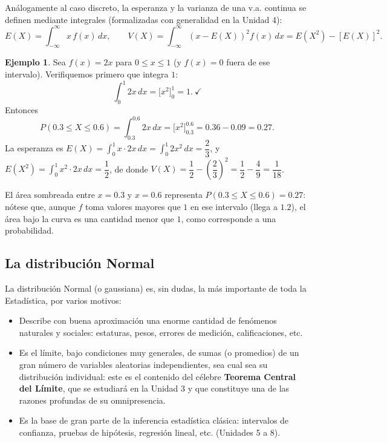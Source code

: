 \documentclass[11pt,a4paper]{article}
\theoremstyle{plain}
\theoremstyle{definition}
\newtheorem{ejemplo}[teorema]{Ejemplo}
\theoremstyle{remark}
\begin{document}
Análogamente al caso discreto, la esperanza y la varianza de una v.a. continua se definen mediante integrales (formalizadas con generalidad en la Unidad 4):
$$E(X)=\int_{-\infty}^{\infty}x\,f(x)\,dx,\qquad V(X)=\int_{-\infty}^{\infty}(x-E(X))^2f(x)\,dx=E(X^2)-[E(X)]^2.$$

\begin{ejemplo}
Sea $f(x)=2x$ para $0\le x\le1$ (y $f(x)=0$ fuera de ese intervalo). Verifiquemos primero que integra $1$:
$$\int_0^1 2x\,dx=\big[x^2\big]_0^1=1.\ \checkmark$$
Entonces
$$P(0.3\le X\le0.6)=\int_{0.3}^{0.6}2x\,dx=\big[x^2\big]_{0.3}^{0.6}=0.36-0.09=0.27.$$
La esperanza es $E(X)=\int_0^1 x\cdot2x\,dx=\int_0^1 2x^2\,dx=\dfrac{2}{3}$, y $E(X^2)=\int_0^1x^2\cdot2x\,dx=\dfrac{1}{2}$, de donde $V(X)=\dfrac12-\left(\dfrac23\right)^2=\dfrac12-\dfrac49=\dfrac{1}{18}$.
\end{ejemplo}

\begin{center}
\end{center}

El área sombreada entre $x=0.3$ y $x=0.6$ representa $P(0.3\le X\le0.6)=0.27$: nótese que, aunque $f$ toma valores mayores que $1$ en ese intervalo (llega a $1.2$), el área bajo la curva es una cantidad menor que $1$, como corresponde a una probabilidad.

\subsection{La distribución Normal}

La distribución Normal (o gaussiana) es, sin dudas, la más importante de toda la Estadística, por varios motivos:
\begin{itemize}
\item Describe con buena aproximación una enorme cantidad de fenómenos naturales y sociales: estaturas, pesos, errores de medición, calificaciones, etc.
\item Es el límite, bajo condiciones muy generales, de sumas (o promedios) de un gran número de variables aleatorias independientes, sea cual sea su distribución individual: este es el contenido del célebre \textbf{Teorema Central del Límite}, que se estudiará en la Unidad 3 y que constituye una de las razones profundas de su omnipresencia.
\item Es la base de gran parte de la inferencia estadística clásica: intervalos de confianza, pruebas de hipótesis, regresión lineal, etc. (Unidades 5 a 8).
\end{itemize}
\end{document}
